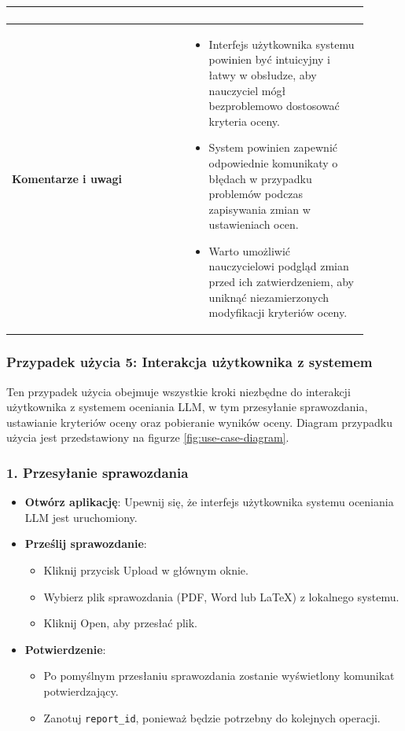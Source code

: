 \documentclass[a4paper, 12pt]{article}
\begin{document}
\begin{center}
\begin{longtable}{|p{0.45\linewidth}|p{0.45\linewidth}|}
\begin{enumerate}
\end{enumerate} \\
\hline
\textbf{Komentarze i uwagi} &
\begin{itemize}
    \item Interfejs użytkownika systemu powinien być intuicyjny i łatwy w obsłudze, aby nauczyciel mógł bezproblemowo dostosować kryteria oceny.
    \item System powinien zapewnić odpowiednie komunikaty o błędach w przypadku problemów podczas zapisywania zmian w ustawieniach ocen.
    \item Warto umożliwić nauczycielowi podgląd zmian przed ich zatwierdzeniem, aby uniknąć niezamierzonych modyfikacji kryteriów oceny.
\end{itemize} \\
\hline
\end{longtable}
\end{center}

\subsubsection*{Przypadek użycia 5: Interakcja użytkownika z systemem}
Ten przypadek użycia obejmuje wszystkie kroki niezbędne do interakcji użytkownika z systemem oceniania LLM, w tym przesyłanie sprawozdania, ustawianie kryteriów oceny oraz pobieranie wyników oceny.
Diagram przypadku użycia jest przedstawiony na figurze \ref{fig:use-case-diagram}.

\subsubsection*{1. Przesyłanie sprawozdania}

\begin{itemize}
    \item \textbf{Otwórz aplikację}: Upewnij się, że interfejs użytkownika systemu oceniania LLM jest uruchomiony.
    \item \textbf{Prześlij sprawozdanie}:
    \begin{itemize}
        \item Kliknij przycisk Upload w głównym oknie.
        \item Wybierz plik sprawozdania (PDF, Word lub LaTeX) z lokalnego systemu.
        \item Kliknij Open, aby przesłać plik.
    \end{itemize}
    \item \textbf{Potwierdzenie}:
    \begin{itemize}
        \item Po pomyślnym przesłaniu sprawozdania zostanie wyświetlony komunikat potwierdzający.
        \item Zanotuj \texttt{report\_id}, ponieważ będzie potrzebny do kolejnych operacji.
    \end{itemize}
\end{itemize}
\end{document}
